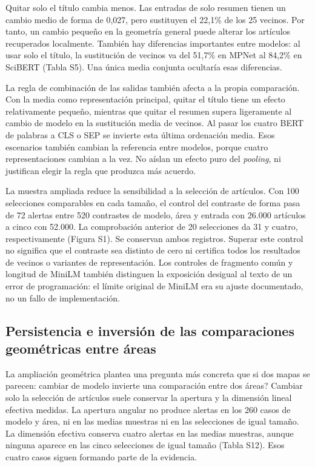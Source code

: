 \documentclass[12pt]{article}
\begin{document}
Quitar solo el título cambia menos. Las entradas de solo resumen tienen un cambio medio de forma de 0,027, pero sustituyen el 22,1\% de los 25 vecinos. Por tanto, un cambio pequeño en la geometría general puede alterar los artículos recuperados localmente. También hay diferencias importantes entre modelos: al usar solo el título, la sustitución de vecinos va del 51,7\% en MPNet al 84,2\% en SciBERT (Tabla S5). Una única media conjunta ocultaría esas diferencias.

La regla de combinación de las salidas también afecta a la propia comparación. Con la media como representación principal, quitar el título tiene un efecto relativamente pequeño, mientras que quitar el resumen supera ligeramente al cambio de modelo en la sustitución media de vecinos. Al pasar los cuatro BERT de palabras a CLS o SEP se invierte esta última ordenación media. Esos escenarios también cambian la referencia entre modelos, porque cuatro representaciones cambian a la vez. No aíslan un efecto puro del \emph{pooling}, ni justifican elegir la regla que produzca más acuerdo.

La muestra ampliada reduce la sensibilidad a la selección de artículos. Con 100 selecciones comparables en cada tamaño, el control del contraste de forma pasa de 72 alertas entre 520 contrastes de modelo, área y entrada con 26.000 artículos a cinco con 52.000. La comprobación anterior de 20 selecciones da 31 y cuatro, respectivamente (Figura S1). Se conservan ambos registros. Superar este control no significa que el contraste sea distinto de cero ni certifica todos los resultados de vecinos o variantes de representación. Los controles de fragmento común y longitud de MiniLM también distinguen la exposición desigual al texto de un error de programación: el límite original de MiniLM era su ajuste documentado, no un fallo de implementación.

\subsection{Persistencia e inversión de las comparaciones geométricas entre áreas}
La ampliación geométrica plantea una pregunta más concreta que si dos mapas se parecen: \textquestiondown{}cambiar de modelo invierte una comparación entre dos áreas? Cambiar solo la selección de artículos suele conservar la apertura y la dimensión lineal efectiva medidas. La apertura angular no produce alertas en los 260 casos de modelo y área, ni en las medias muestras ni en las selecciones de igual tamaño. La dimensión efectiva conserva cuatro alertas en las medias muestras, aunque ninguna aparece en las cinco selecciones de igual tamaño (Tabla S12). Esos cuatro casos siguen formando parte de la evidencia.
\end{document}
